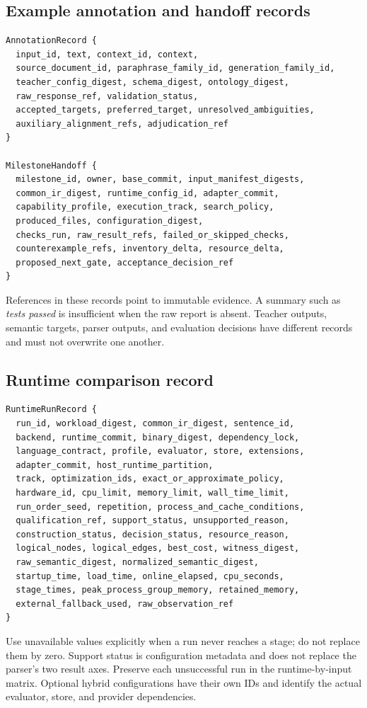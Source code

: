 \documentclass[11pt,a4paper]{article}
\begin{document}
\subsection{Example annotation and handoff records}
\begin{lstlisting}
AnnotationRecord {
  input_id, text, context_id, context,
  source_document_id, paraphrase_family_id, generation_family_id,
  teacher_config_digest, schema_digest, ontology_digest,
  raw_response_ref, validation_status,
  accepted_targets, preferred_target, unresolved_ambiguities,
  auxiliary_alignment_refs, adjudication_ref
}

MilestoneHandoff {
  milestone_id, owner, base_commit, input_manifest_digests,
  common_ir_digest, runtime_config_id, adapter_commit,
  capability_profile, execution_track, search_policy,
  produced_files, configuration_digest,
  checks_run, raw_result_refs, failed_or_skipped_checks,
  counterexample_refs, inventory_delta, resource_delta,
  proposed_next_gate, acceptance_decision_ref
}
\end{lstlisting}
References in these records point to immutable evidence. A summary such as
\emph{tests passed} is insufficient when the raw report is absent.
Teacher outputs, semantic targets, parser outputs, and evaluation decisions
have different records and must not overwrite one another.

\clearpage
\subsection{Runtime comparison record}
\begin{lstlisting}
RuntimeRunRecord {
  run_id, workload_digest, common_ir_digest, sentence_id,
  backend, runtime_commit, binary_digest, dependency_lock,
  language_contract, profile, evaluator, store, extensions,
  adapter_commit, host_runtime_partition,
  track, optimization_ids, exact_or_approximate_policy,
  hardware_id, cpu_limit, memory_limit, wall_time_limit,
  run_order_seed, repetition, process_and_cache_conditions,
  qualification_ref, support_status, unsupported_reason,
  construction_status, decision_status, resource_reason,
  logical_nodes, logical_edges, best_cost, witness_digest,
  raw_semantic_digest, normalized_semantic_digest,
  startup_time, load_time, online_elapsed, cpu_seconds,
  stage_times, peak_process_group_memory, retained_memory,
  external_fallback_used, raw_observation_ref
}
\end{lstlisting}
Use unavailable values explicitly when a run never reaches a stage; do not
replace them by zero. Support status is configuration metadata and does not
replace the parser's two result axes. Preserve each unsuccessful run in the
runtime-by-input matrix. Optional hybrid configurations have their own IDs
and identify the actual evaluator, store, and provider dependencies.
\end{document}

